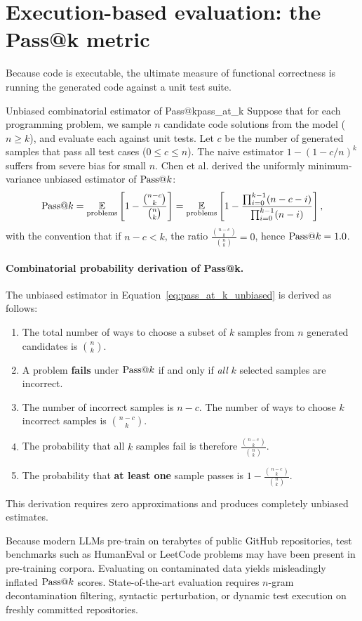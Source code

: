 \documentclass[../../main.tex]{subfiles}
\begin{document}
\section{Execution-based evaluation: the Pass@k metric}
Because code is executable, the ultimate measure of functional correctness is running the generated code against a unit test suite.

\begin{theorem}{Unbiased combinatorial estimator of Pass@k}{pass_at_k}
Suppose that for each programming problem, we sample $n$ candidate code solutions from the model ($n \ge k$), and evaluate each against unit tests. Let $c$ be the number of generated samples that pass all test cases ($0 \le c \le n$).
The naive estimator $1 - (1 - c/n)^k$ suffers from severe bias for small $n$. Chen et al. \citep{chen2021codex} derived the uniformly minimum-variance unbiased estimator of $\mathrm{Pass}@k$:
\begin{equation}
\label{eq:pass_at_k_unbiased}
\mathrm{Pass}@k = \operatorname*{\mathbb{E}}_{\text{problems}} \left[ 1 - \frac{\binom{n - c}{k}}{\binom{n}{k}} \right] = \operatorname*{\mathbb{E}}_{\text{problems}} \left[ 1 - \frac{\prod_{i=0}^{k-1} (n - c - i)}{\prod_{i=0}^{k-1} (n - i)} \right],
\end{equation}
with the convention that if $n - c < k$, the ratio $\frac{\binom{n-c}{k}}{\binom{n}{k}} = 0$, hence $\mathrm{Pass}@k = 1.0$.
\end{theorem}

\paragraph{Combinatorial probability derivation of Pass@k.}
The unbiased estimator in Equation~\eqref{eq:pass_at_k_unbiased} is derived as follows:
\begin{enumerate}
    \item The total number of ways to choose a subset of $k$ samples from $n$ generated candidates is $\binom{n}{k}$.
    \item A problem \textbf{fails} under $\mathrm{Pass}@k$ if and only if \emph{all} $k$ selected samples are incorrect.
    \item The number of incorrect samples is $n - c$. The number of ways to choose $k$ incorrect samples is $\binom{n-c}{k}$.
    \item The probability that all $k$ samples fail is therefore $\frac{\binom{n-c}{k}}{\binom{n}{k}}$.
    \item The probability that \textbf{at least one} sample passes is $1 - \frac{\binom{n-c}{k}}{\binom{n}{k}}$.
\end{enumerate}
This derivation requires zero approximations and produces completely unbiased estimates.


\begin{deepdive}
Because modern LLMs pre-train on terabytes of public GitHub repositories, test benchmarks such as HumanEval or LeetCode problems may have been present in pre-training corpora. Evaluating on contaminated data yields misleadingly inflated $\mathrm{Pass}@k$ scores. State-of-the-art evaluation requires $n$-gram decontamination filtering, syntactic perturbation, or dynamic test execution on freshly committed repositories.
\end{deepdive}
\end{document}
